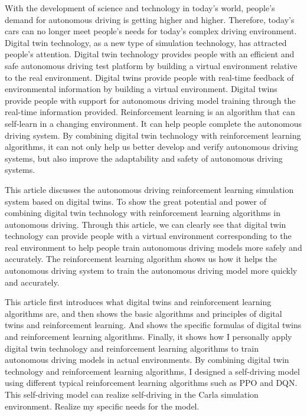 \begin{abstracten}
With the development of science and technology in today's world, people's demand for autonomous driving is getting higher and higher. Therefore, today's cars can no longer meet people's needs for today's complex driving environment. Digital twin technology, as a new type of simulation technology, has attracted people's attention. Digital twin technology provides people with an efficient and safe autonomous driving test platform by building a virtual environment relative to the real environment. Digital twins provide people with real-time feedback of environmental information by building a virtual environment. Digital twins provide people with support for autonomous driving model training through the real-time information provided. Reinforcement learning is an algorithm that can self-learn in a changing environment. It can help people complete the autonomous driving system. By combining digital twin technology with reinforcement learning algorithms, it can not only help us better develop and verify autonomous driving systems, but also improve the adaptability and safety of autonomous driving systems.

This article discusses the autonomous driving reinforcement learning simulation system based on digital twins. To show the great potential and power of combining digital twin technology with reinforcement learning algorithms in autonomous driving. Through this article, we can clearly see that digital twin technology can provide people with a virtual environment corresponding to the real environment to help people train autonomous driving models more safely and accurately. The reinforcement learning algorithm shows us how it helps the autonomous driving system to train the autonomous driving model more quickly and accurately.

This article first introduces what digital twins and reinforcement learning algorithms are, and then shows the basic algorithms and principles of digital twins and reinforcement learning. And shows the specific formulas of digital twins and reinforcement learning algorithms. Finally, it shows how I personally apply digital twin technology and reinforcement learning algorithms to train autonomous driving models in actual environments. By combining digital twin technology and reinforcement learning algorithms, I designed a self-driving model using different typical reinforcement learning algorithms such as PPO and DQN. This self-driving model can realize self-driving in the Carla simulation environment. Realize my specific needs for the model.
\end{abstracten}